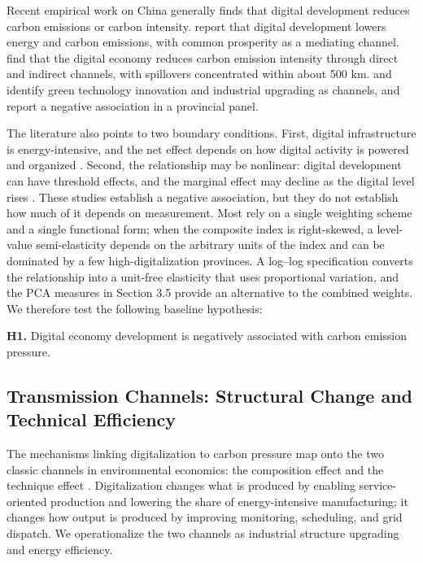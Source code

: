 \documentclass[economies,article,submit,moreauthors]{Definitions/mdpi}
\begin{document}
Recent empirical work on China generally finds that digital development reduces carbon emissions or carbon intensity. \citet{gao2024} report that digital development lowers energy and carbon emissions, with common prosperity as a mediating channel. \citet{zhang2025} find that the digital economy reduces carbon emission intensity through direct and indirect channels, with spillovers concentrated within about 500 km. \citet{huangwu2024} and \citet{zhang2024sust} identify green technology innovation and industrial upgrading as channels, and \citet{song2024} report a negative association in a provincial panel.

The literature also points to two boundary conditions. First, digital infrastructure is energy-intensive, and the net effect depends on how digital activity is powered and organized \citep{liuwang2025}. Second, the relationship may be nonlinear: digital development can have threshold effects, and the marginal effect may decline as the digital level rises \citep{zhang2024sust,zhang2025}. These studies establish a negative association, but they do not establish how much of it depends on measurement. Most rely on a single weighting scheme and a single functional form; when the composite index is right-skewed, a level-value semi-elasticity depends on the arbitrary units of the index and can be dominated by a few high-digitalization provinces. A log--log specification converts the relationship into a unit-free elasticity that uses proportional variation, and the PCA measures in Section 3.5 provide an alternative to the combined weights. We therefore test the following baseline hypothesis:

\textbf{H1.} Digital economy development is negatively associated with carbon emission pressure.

\subsection{Transmission Channels: Structural Change and Technical Efficiency}

The mechanisms linking digitalization to carbon pressure map onto the two classic channels in environmental economics: the composition effect and the technique effect \citep{grossman1991}. Digitalization changes what is produced by enabling service-oriented production and lowering the share of energy-intensive manufacturing; it changes how output is produced by improving monitoring, scheduling, and grid dispatch. We operationalize the two channels as industrial structure upgrading and energy efficiency.
\end{document}
